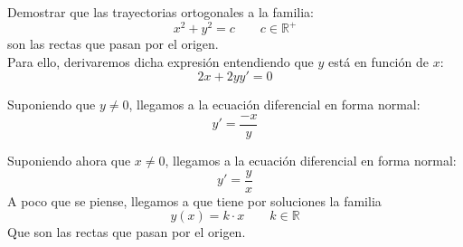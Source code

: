 \begin{ejemplo}
    Demostrar que las trayectorias ortogonales a la familia:
    \begin{equation*}
        x^2 + y^2 = c \qquad c\in \mathbb{R}^+
    \end{equation*}
    son las rectas que pasan por el origen.\\

    Para ello, derivaremos dicha expresión entendiendo que $y$ está en función de $x$:
    \begin{equation*}
        2x + 2yy' = 0
    \end{equation*}

    Suponiendo que $y\neq 0$, llegamos a la ecuación diferencial en forma normal:
    \begin{equation*}
        y' = \dfrac{-x}{y}
    \end{equation*}

    Suponiendo ahora que $x\neq 0$, llegamos a la ecuación diferencial en forma normal:
    \begin{equation*}
        y' = \dfrac{y}{x}
    \end{equation*}
    A poco que se piense, llegamos a que tiene por soluciones la familia
    \begin{equation*}
        y(x) = k\cdot x \qquad k\in \mathbb{R}
    \end{equation*}
    Que son las rectas que pasan por el origen.
\end{ejemplo}

